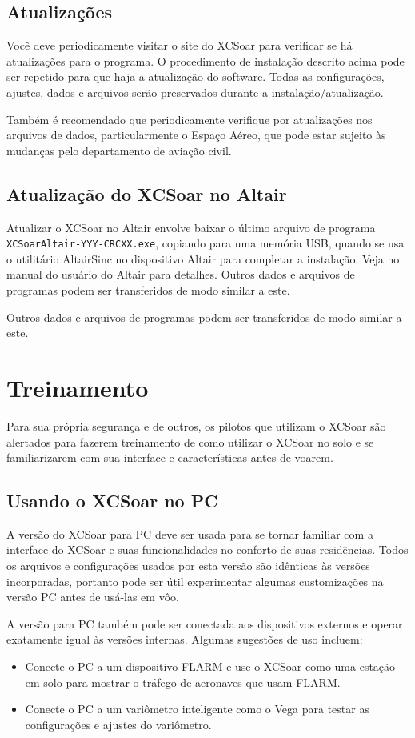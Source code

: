 \subsection*{Atualizações}
Você deve periodicamente visitar o site do XCSoar para verificar se há atualizações para o programa.  O procedimento de instalação descrito acima pode ser repetido para que haja a atualização do software.  Todas as configurações, ajustes, dados e arquivos serão preservados durante a instalação/atualização.

Também é recomendado que periodicamente verifique por atualizações nos arquivos de dados, particularmente o Espaço Aéreo, que pode estar sujeito às mudanças pelo departamento de aviação civil.

\subsection*{Atualização do XCSoar no Altair}
Atualizar o XCSoar no Altair envolve baixar o último arquivo de programa 
{\tt XCSoarAltair-YYY-CRCXX.exe}, copiando para uma memória USB, quando se usa o utilitário AltairSinc no dispositivo Altair para completar a instalação.  Veja no manual do usuário do Altair para detalhes.
Outros dados e arquivos de programas podem ser transferidos de modo similar a este.

Outros dados e arquivos de programas podem ser transferidos de modo similar a este.

\section{Treinamento}
Para sua própria segurança e de outros, os pilotos que utilizam o XCSoar são alertados para fazerem treinamento de como utilizar o XCSoar no solo e se familiarizarem com sua interface e características antes de voarem.

\subsection*{Usando o XCSoar no PC}
A versão do XCSoar para PC deve ser usada para se tornar familiar com a interface do XCSoar e suas funcionalidades no conforto de suas residências.  Todos os arquivos e configurações usados por esta versão são idênticas às versões incorporadas, portanto pode ser útil experimentar algumas customizações na versão PC antes de usá-las em vôo.

A versão para PC também pode ser conectada aos dispositivos externos e operar exatamente igual às versões internas.  Algumas sugestões de uso incluem:
\begin{itemize}
\item Conecte o PC a um dispositivo FLARM e use o XCSoar como uma estação em solo para mostrar o tráfego de aeronaves que usam FLARM.
\item Conecte o PC a um variômetro inteligente como o Vega para testar as configurações e ajustes do variômetro.
\end{itemize}

